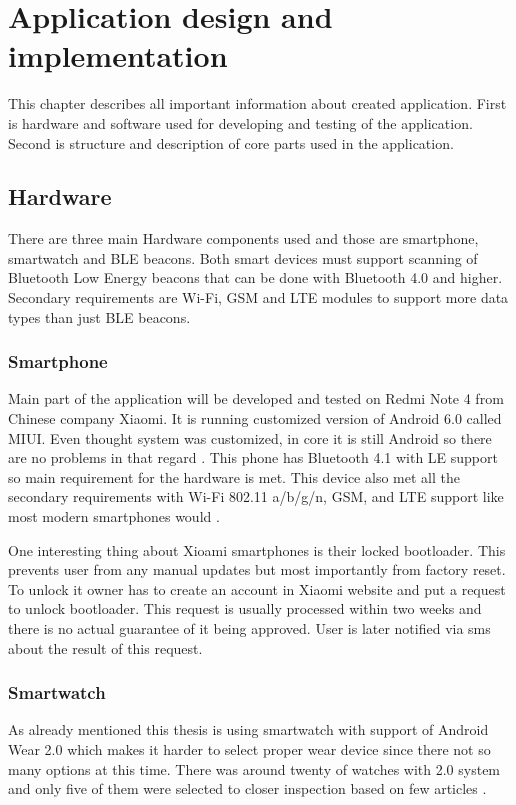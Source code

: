 \chapter{Application design and implementation}\label{sec:ApplicationDesingAndImplementation}
This chapter describes all important information about created application. First is hardware and software used for developing and testing of the application. Second is structure and description of core parts used in the application. 

\section{Hardware}\label{sec:Hardware}
There are three main Hardware components used and those are smartphone, smartwatch and BLE beacons. Both smart devices must support scanning of Bluetooth Low Energy beacons that can be done with Bluetooth 4.0 and higher. Secondary requirements are Wi-Fi, GSM and LTE modules to support more data types than just BLE beacons.

\subsection{Smartphone}\label{subsec:Smartphone}
Main part of the application will be developed and tested on Redmi Note 4 from Chinese company Xiaomi. It is running customized version of Android 6.0 called MIUI. Even thought system was customized, in core it is still Android so there are no problems in that regard \cite{XRN4LTE}. This phone has Bluetooth 4.1 with LE support so main requirement for the hardware is met. This device also met all the secondary requirements with Wi-Fi 802.11 a/b/g/n, GSM, and LTE support like most modern smartphones would \cite{XRN4FPS}.

One interesting thing about Xioami smartphones is their locked bootloader. This prevents user from any manual updates but most importantly from factory reset. To unlock it owner has to create an account in Xiaomi website and put a request to unlock bootloader. This request is usually processed within two weeks and there is no actual guarantee of it being approved. User is later notified via sms about the result of this request.

\subsection{Smartwatch}\label{subsec:Smartwatch}
As already mentioned this thesis is using smartwatch with support of Android Wear 2.0 which makes it harder to select proper wear device since there not so many options at this time. There was around twenty of watches with 2.0 system and only five of them were selected to closer inspection based on few articles \cite{BAWW, BAWW18, BAWW17}.

